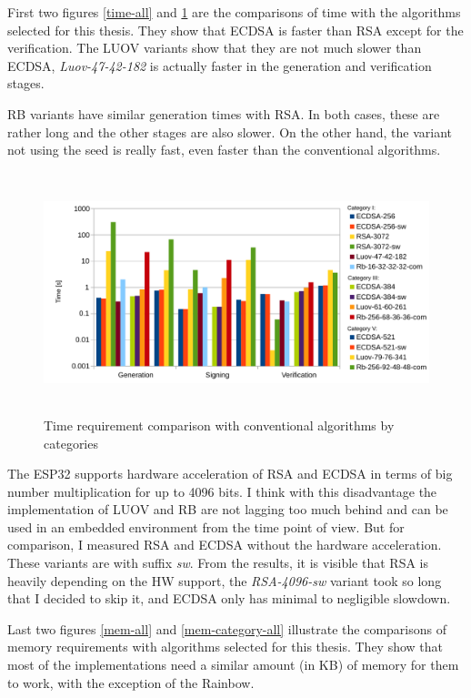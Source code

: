 \documentclass[thesis=M,english]{FITthesis}[2019/12/23]
\begin{document}
\noindent
First two figures \ref{time-all} and \ref{time-category-all} are the comparisons of time with the algorithms selected for this thesis. They show that ECDSA is faster than RSA except for the verification. The LUOV variants show that they are not much slower than ECDSA, \textit{Luov-47-42-182} is actually faster in the generation and verification stages. 

\bigskip
\noindent
RB variants have similar generation times  with RSA. In both cases, these are rather long and the other stages are also slower. On the other hand, the variant not using the seed is really fast, even faster than the conventional algorithms. 

\begin{figure}[H]
\centering
\includegraphics[width=13cm,height=7cm]{images/time-category-all.pdf}
\caption{Time requirement comparison with conventional algorithms by categories}
\label{time-category-all}
\end{figure}

\bigskip
\noindent
The ESP32 supports hardware acceleration of RSA and ECDSA in terms of big number multiplication for up to 4096 bits. I think with this disadvantage the implementation of LUOV and RB are not lagging too much behind and can be used in an embedded environment from the time point of view. But for comparison, I measured RSA and ECDSA without the hardware acceleration. These variants are with suffix \textit{sw}. From the results, it is visible that RSA is heavily depending on the HW support, the \textit{RSA-4096-sw} variant took so long that I decided to skip it, and ECDSA only has minimal to negligible slowdown. 

\bigskip
\noindent
Last two figures \ref{mem-all} and \ref{mem-category-all} illustrate the comparisons of memory requirements with algorithms selected for this thesis. They show that most of the implementations need a similar  amount (in KB) of memory for them to work, with the exception of the Rainbow. 
\end{document}
